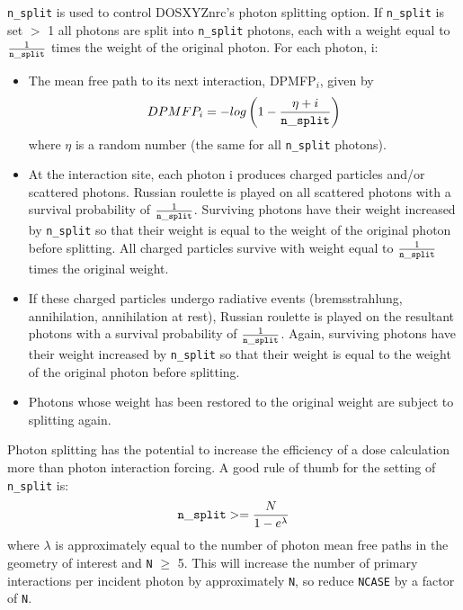 \documentclass[12pt,twoside]{article}      %
\begin{document}
{\tt n\_split} is used to control DOSXYZnrc's photon splitting option.
If {\tt n\_split} is set $>$ 1 all photons are split
into {\tt n\_split} photons, each with a weight equal to
$\frac{1}{{\tt n\_split}}$ times the weight of the original photon.  For each
photon, i:
\begin{itemize}
\item The mean free path to its next interaction, DPMFP$_i$, given by
\begin{equation}
DPMFP_i=-log\left(1-\frac{\eta+i}{{\tt n\_split}}\right)
\end{equation}
where $\eta$ is a random number (the same for all {\tt n\_split} photons).
\item At the interaction site, each photon i produces charged particles and/or
scattered
photons.  Russian roulette is played on all scattered photons with a
survival probability of $\frac{1}{{\tt n\_split}}$.  Surviving photons
have their weight increased by {\tt n\_split} so that their weight is equal
to the weight of the
original photon before splitting.  All charged particles survive with weight equal
to $\frac{1}{{\tt n\_split}}$ times the original weight.
\item If these charged particles undergo radiative events (bremsstrahlung,
  annihilation, annihilation at rest), Russian roulette is played on the
  resultant photons with a survival probability of $\frac{1}{{\tt n\_split}}$.  Again,
  surviving photons have their weight increased by {\tt n\_split} so that their
  weight is equal to the weight of the original photon before splitting.
\item Photons whose weight has been restored to the original weight are
  subject to splitting again.
\end{itemize}

Photon splitting has the potential to increase the efficiency of a dose
calculation more than photon interaction forcing.  A good rule of thumb for
the setting of {\tt n\_split} is:
\begin{equation}
{\tt n\_split}>=\frac{N}{1-e^\lambda}
\end{equation}
where $\lambda$ is approximately equal to the number of photon mean free paths
in the geometry of interest and {\tt N} $\geq$ 5.  This will increase the
number of primary interactions per incident photon by approximately {\tt N},
so reduce {\tt NCASE} by a factor of {\tt N}.
\end{document}
